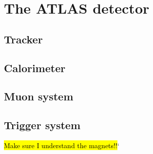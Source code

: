 \chapter{The  ATLAS detector}
\label{ch:atlas}

\section{Tracker}

\section{Calorimeter}

\section{Muon system}

\section{Trigger system}

\hl{Make sure I understand the magnets!!}`